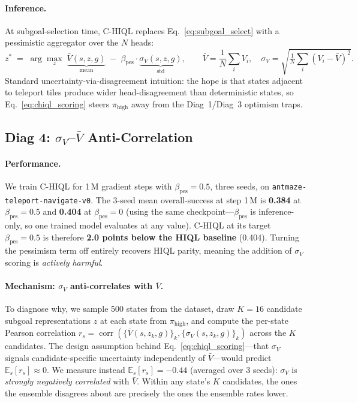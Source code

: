 \documentclass[11pt]{article}
\begin{document}
\paragraph{Inference.}
At subgoal-selection time, C-HIQL replaces Eq.~\eqref{eq:subgoal_select} with a
pessimistic aggregator over the $N$ heads:
\begin{equation}
  z^* \;=\;
  \arg\max_{z}\;\underbrace{\bar V(s,z,g)}_{\text{mean}}
  \;-\;\beta_\text{pes}\cdot\underbrace{\sigma_V(s,z,g)}_{\text{std}},
  \qquad
  \bar V = \frac{1}{N}\sum_i V_i,\quad
  \sigma_V = \sqrt{\tfrac{1}{N}\sum_i (V_i - \bar V)^2}.
  \label{eq:chiql_scoring}
\end{equation}
Standard uncertainty-via-disagreement intuition: the hope is that states
adjacent to teleport tiles produce wider head-disagreement than
deterministic states, so Eq.~\eqref{eq:chiql_scoring} steers
$\pi_\text{high}$ away from the Diag~1/Diag~3 optimism traps.

\subsection{Diag 4: $\sigma_V$--$\bar V$ Anti-Correlation}
\label{subsec:chiql_eval}

\paragraph{Performance.}
We train C-HIQL for 1\,M gradient steps with $\beta_\text{pes} = 0.5$, three
seeds, on \texttt{antmaze-teleport-navigate-v0}.
The 3-seed mean overall-success at step 1\,M is \textbf{0.384} at
$\beta_\text{pes} = 0.5$ and \textbf{0.404} at $\beta_\text{pes} = 0$ (using the
same checkpoint---$\beta_\text{pes}$ is inference-only, so one trained model
evaluates at any value).
C-HIQL at its target $\beta_\text{pes} = 0.5$ is therefore
\textbf{2.0 points below the HIQL baseline} (0.404). Turning the
pessimism term off entirely recovers HIQL parity, meaning the addition of
$\sigma_V$ scoring is \emph{actively harmful}.

\paragraph{Mechanism: $\sigma_V$ anti-correlates with $\bar V$.}
To diagnose why, we sample 500 states from the dataset, draw $K=16$ candidate
subgoal representations $z$ at each state from $\pi_\text{high}$, and compute
the per-state Pearson correlation
$r_s = \operatorname{corr}(\{\bar V(s, z_k, g)\}_k, \{\sigma_V(s, z_k, g)\}_k)$
across the $K$ candidates.
The design assumption behind Eq.~\eqref{eq:chiql_scoring}---that $\sigma_V$
signals candidate-specific uncertainty independently of $\bar V$---would predict
$\mathbb{E}_s[r_s] \approx 0$.
We measure instead
$\mathbb{E}_s[r_s] = \mathbf{-0.44}$ (averaged over 3 seeds): $\sigma_V$ is
\emph{strongly negatively correlated} with $\bar V$.
Within any state's $K$ candidates, the ones the ensemble disagrees about are
precisely the ones the ensemble rates lower.
\end{document}
